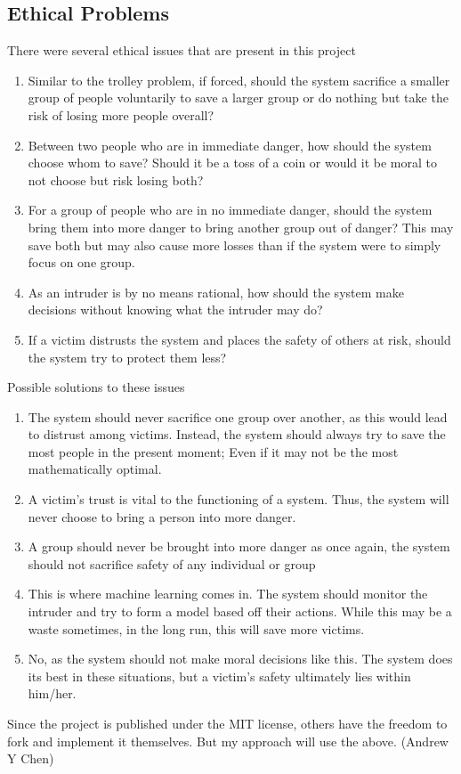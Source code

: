 \documentclass[12pt]{article}
\begin{document}
\subsection*{Ethical Problems}
There were several ethical issues that are present in this project
\begin{enumerate}
\item Similar to the trolley problem, if forced, should the system sacrifice a smaller group of people voluntarily to save a larger group or do nothing but take the risk of losing more people overall?
\item Between two people who are in immediate danger, how should the system choose whom to save? Should it be a toss of a coin or would it be moral to not choose but risk losing both?
\item For a group of people who are in no immediate danger, should the system bring them into more danger to bring another group out of danger? This may save both but may also cause more losses than if the system were to simply focus on one group.
\item As an intruder is by no means rational, how should the system make decisions without knowing what the intruder may do?
\item If a victim distrusts the system and places the safety of others at risk, should the system try to protect them less?
\end{enumerate}
Possible solutions to these issues
\begin{enumerate}
\item The system should never sacrifice one group over another, as this would lead to distrust among victims. Instead, the system should always try to save the most people in the present moment; Even if it may not be the most mathematically optimal.
\item A victim's trust is vital to the functioning of a system. Thus, the system will never choose to bring a person into more danger.
\item A group should never be brought into more danger as once again, the system should not sacrifice safety of any individual or group
\item This is where machine learning comes in. The system should monitor the intruder and try to form a model based off their actions. While this may be a waste sometimes, in the long run, this will save more victims.
\item No, as the system should not make moral decisions like this. The system does its best in these situations, but a victim's safety ultimately lies within him/her.
\end{enumerate}
Since the project is published under the MIT license, others have the freedom to fork and implement it themselves. But my approach will use the above. (Andrew Y Chen)
\end{document}
